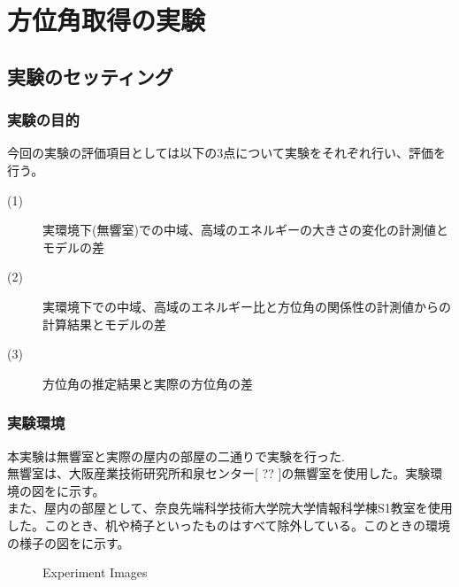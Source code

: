 \section{方位角取得の実験}
\label{chap:exp_azimuth_angle}
\subsection{実験のセッティング}
\label{sec:anechoic_chamber}
\subsubsection{実験の目的}\label{exp_popse}
今回の実験の評価項目としては以下の3点について実験をそれぞれ行い、評価を行う。
\begin{description}
  \item[(1)] 実環境下(無響室)での中域、高域のエネルギーの大きさの変化の計測値とモデルの差
  \item[(2)] 実環境下での中域、高域のエネルギー比と方位角の関係性の計測値からの計算結果とモデルの差
  \item[(3)] 方位角の推定結果と実際の方位角の差
\end{description}

\subsubsection{実験環境}
本実験は無響室と実際の屋内の部屋の二通りで実験を行った.\\
無響室は、大阪産業技術研究所和泉センター[ ?? ]の無響室を使用した。実験環境の図をに示す。\\
また、屋内の部屋として、奈良先端科学技術大学院大学情報科学棟S1教室を使用した。このとき、机や椅子といったものはすべて除外している。このときの環境の様子の図をに示す。\\

\begin{figure}[tb]
    \centering
    \label{fig:chamber}
    \label{fig:room}
    \caption{Experiment Images}
    \label{fig:exp_photo}
\end{figure}

